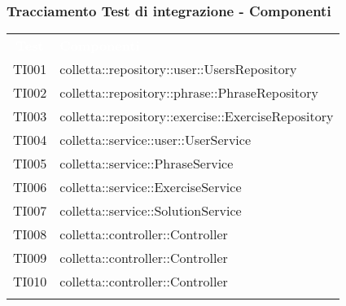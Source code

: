 
\subsubsection{Tracciamento Test di integrazione - Componenti}

\begin{tabularx}{\textwidth}{cX}
	
	\rowcolor{greySWEight}
	
	\rowcolor{greySWEight}
	\textcolor{white}{\textbf{Test}} & 
	\textcolor{white}{\textbf{Componenti}} \\
	
	TI001 & colletta::repository::user::UsersRepository \\
	TI002 & colletta::repository::phrase::PhraseRepository \\
	TI003 & colletta::repository::exercise::ExerciseRepository \\
	TI004 & colletta::service::user::UserService \\
	TI005 & colletta::service::PhraseService \\
	TI006 & colletta::service::ExerciseService \\
	TI007 & colletta::service::SolutionService \\
	TI008 & colletta::controller::Controller \\
	TI009 & colletta::controller::Controller \\
	TI010 & colletta::controller::Controller \\
	
	\rowcolor{white}
	\caption{Tracciamento test di integrazione - componenti}
	\label{tab:tracciamentotestintegrazione}
\end{tabularx}
